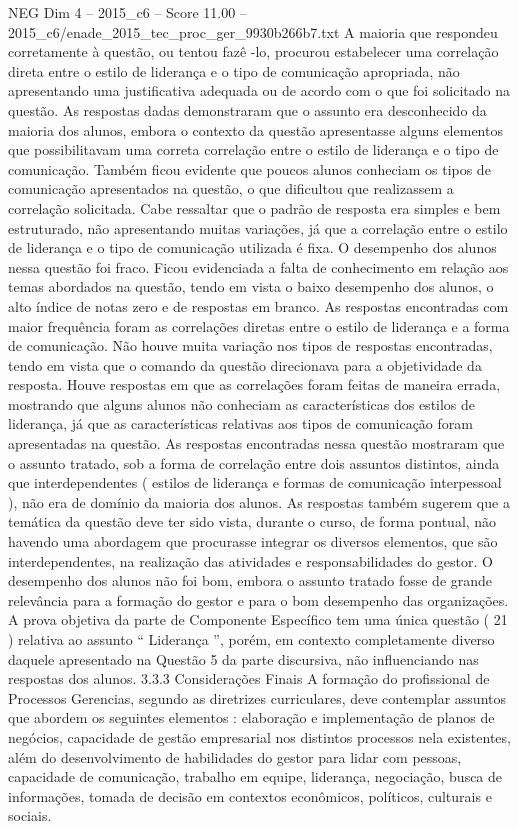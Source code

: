 \begin{textsample}{NEG Dim 4 – 2015\_c6 – Score 11.00 – 2015\_c6/enade\_2015\_tec\_proc\_ger\_9930b266b7.txt}
A maioria que respondeu corretamente à questão, ou tentou fazê -lo, procurou estabelecer uma correlação direta entre o estilo de liderança e o tipo de comunicação apropriada, não apresentando uma justificativa adequada ou de acordo com o que foi solicitado na questão.
As respostas dadas demonstraram que o assunto era desconhecido da maioria dos alunos, embora o contexto da questão apresentasse alguns elementos que possibilitavam uma correta correlação entre o estilo de liderança e o tipo de comunicação.
Também ficou evidente que poucos alunos conheciam os tipos de comunicação apresentados na questão, o que dificultou que realizassem a correlação solicitada.
Cabe ressaltar que o padrão de resposta era simples e bem estruturado, não apresentando muitas variações, já que a correlação entre o estilo de liderança e o tipo de comunicação utilizada é fixa.
O desempenho dos alunos nessa questão foi fraco.
Ficou evidenciada a falta de conhecimento em relação aos temas abordados na questão, tendo em vista o baixo desempenho dos alunos, o alto índice de notas zero e de respostas em branco.
As respostas encontradas com maior frequência foram as correlações diretas entre o estilo de liderança e a forma de comunicação.
Não houve muita variação nos tipos de respostas encontradas, tendo em vista que o comando da questão direcionava para a objetividade da resposta.
Houve respostas em que as correlações foram feitas de maneira errada, mostrando que alguns alunos não conheciam as características dos estilos de liderança, já que as características relativas aos tipos de comunicação foram apresentadas na questão.
As respostas encontradas nessa questão mostraram que o assunto tratado, sob a forma de correlação entre dois assuntos distintos, ainda que interdependentes ( estilos de liderança e formas de comunicação interpessoal ), não era de domínio da maioria dos alunos.
As respostas também sugerem que a temática da questão deve ter sido vista, durante o curso, de forma pontual, não havendo uma abordagem que procurasse integrar os diversos elementos, que são interdependentes, na realização das atividades e responsabilidades do gestor.
O desempenho dos alunos não foi bom, embora o assunto tratado fosse de grande relevância para a formação do gestor e para o bom desempenho das organizações.
A prova objetiva da parte de Componente Específico tem uma única questão ( 21 ) relativa ao assunto “ Liderança ”, porém, em contexto completamente diverso daquele apresentado na Questão 5 da parte discursiva, não influenciando nas respostas dos alunos. 3.3.3 Considerações Finais A formação do profissional de Processos Gerencias, segundo as diretrizes curriculares, deve contemplar assuntos que abordem os seguintes elementos : elaboração e implementação de planos de negócios, capacidade de gestão empresarial nos distintos processos nela existentes, além do desenvolvimento de habilidades do gestor para lidar com pessoas, capacidade de comunicação, trabalho em equipe, liderança, negociação, busca de informações, tomada de decisão em contextos econômicos, políticos, culturais e sociais.

\end{textsample}
